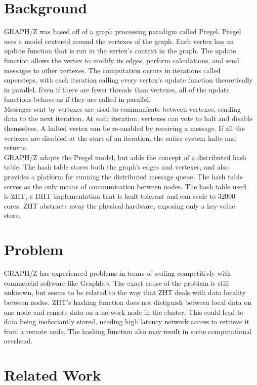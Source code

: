 \documentclass[10pt]{article}
\begin{document}
\begin{multicols}{2} 
  \section{Background}
  GRAPH/Z was based off of a graph processing paradigm called Pregel. Pregel uses a model centered around the vertexes of the graph. Each vertex has an update function that is run in the vertex's context in the graph. The update function allows the vertex to modify its edges, perform calculations, and send messages to other vertexes. The computation occurs in iterations called supersteps, with each iteration calling every vertex's update function theoretically in parallel. Even if there are fewer threads than vertexes, all of the update functions behave as if they are called in parallel.\\
  Messages sent by vertexes are used to communicate between vertexes, sending data to the next iteration. At each iteration, vertexes can vote to halt and disable themselves. A halted vertex can be re-enabled by receiving a message. If all the vertexes are disabled at the start of an iteration, the entire system halts and returns.\\
  GRAPH/Z adapts the Pregel model, but adds the concept of a distributed hash table. The hash table stores both the graph's edges and vertexes, and also provides a platform for running the distributed message queue. The hash table serves as the only means of communication between nodes. The hash table used is ZHT, a DHT implementation that is fault-tolerant and can scale to 32000 cores. ZHT abstracts away the physical hardware, exposing only a key-value store. 
  \section{Problem}
  GRAPH/Z has experienced problems in terms of scaling competitivly with commercial software like Graphlab. The exact cause of the problem is still unknown, but seems to be related to the way that ZHT deals with data locality between nodes. ZHT's hashing function does not distiguish between local data on one node and remote data on a network node in the cluster. This could lead to data being ineficciantly stored, needing high latency network access to retrieve it from a remote node. The hashing function also may result in some computational overhead. 
  \section{Related Work}

\end{multicols}
\end{document}
